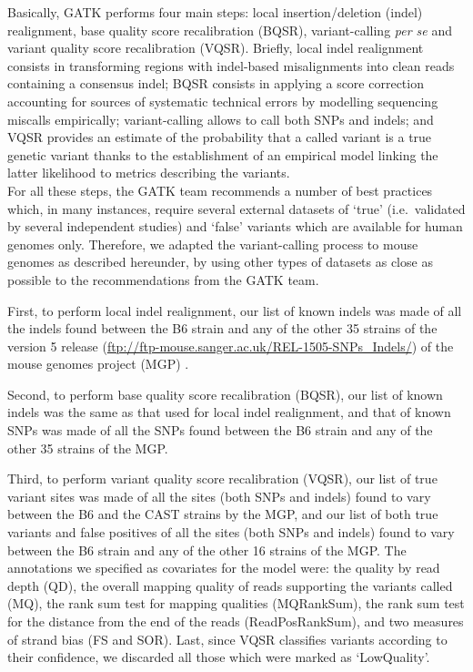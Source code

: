 Basically, GATK performs four main steps: local insertion/deletion (indel) realignment, base quality score recalibration (BQSR), variant-calling \textit{per se} and variant quality score recalibration (VQSR).
Briefly, local indel realignment consists in transforming regions with indel-based misalignments into clean reads containing a consensus indel; BQSR consists in applying a score correction accounting for sources of systematic technical errors by modelling sequencing miscalls empirically; variant-calling allows to call both SNPs and indels; and VQSR provides an estimate of the probability that a called variant is a true genetic variant thanks to the establishment of an empirical model linking the latter likelihood to metrics describing the variants.\\

For all these steps, the GATK team recommends a number of best practices \citep{depristo2011framework, vanderauwera2013fastq} which, in many instances, require several external datasets of ‘true’ (i.e.\ validated by several independent studies) and ‘false’ variants which are available for human genomes only.
Therefore, we adapted the variant-calling process to mouse genomes as described hereunder, by using other types of datasets as close as possible to the recommendations from the GATK team. 

First, to perform local indel realignment, our list of known indels was made of all the indels found between the B6 strain and any of the other 35 strains of the version 5 release (\url{ftp://ftp-mouse.sanger.ac.uk/REL-1505-SNPs_Indels/}) of the mouse genomes project (MGP) \citep{keane2011mouse}.

Second, to perform base quality score recalibration (BQSR), our list of known indels was the same as that used for local indel realignment, and that of known SNPs was made of all the SNPs found between the B6 strain and any of the other 35 strains of the MGP\@.

Third, to perform variant quality score recalibration (VQSR), our list of true variant sites was made of all the sites (both SNPs and indels) found to vary between the B6 and the CAST strains by the MGP, and our list of both true variants and false positives of all the sites (both SNPs and indels) found to vary between the B6 strain and any of the other 16 strains of the MGP\@. 
The annotations we specified as covariates for the model were: the quality by read depth (QD), the overall mapping quality of reads supporting the variants called (MQ), the rank sum test for mapping qualities (MQRankSum), the rank sum test for the distance from the end of the reads (ReadPosRankSum), and two measures of strand bias (FS and SOR).
Last, since VQSR classifies variants according to their confidence, we discarded all those which were marked as ‘LowQuality’.





